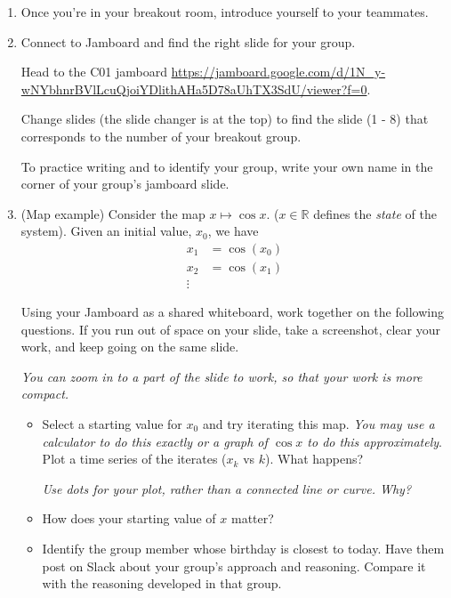 \documentclass[12pt,letterpaper,noanswers]{exam}
\begin{document}
\begin{enumerate}
\item  Once you're in your breakout room, introduce yourself to your teammates.  

\item Connect to Jamboard and find the right slide for your group.

Head to the C01 jamboard \url{https://jamboard.google.com/d/1N_y-wNYbhnrBVlLcuQjoiYDlithAHa5D78aUhTX3SdU/viewer?f=0}.  

Change slides (the slide changer is at the top) to find the slide (1 - 8) that corresponds to the number of your breakout group.

To practice writing and to identify your group, write your own name in the corner of your group's jamboard slide.


\item  (Map example) Consider the map $x\mapsto \cos x.$  ($x\in \mathbb{R}$ defines the {\it{state}} of the system).  Given an initial value, $x_0$, we have
\begin{align*}
x_1 &=\cos(x_0) \\
x_2 &= \cos(x_1) \\
\vdots
\end{align*}

Using your Jamboard as a shared whiteboard, work together on the following questions.  If you run out of space on your slide, take a screenshot, clear your work, and keep going on the same slide.

\emph{You can zoom in to a part of the slide to work, so that your work is more compact.}

\begin{itemize}
\item Select a starting value for $x_0$ and try iterating this map.  \emph{You may use a calculator to do this exactly or a graph of $\cos x$ to do this approximately}.  Plot a time series of the iterates ($x_k$ vs $k$).  What happens?

\emph{Use dots for your plot, rather than a connected line or curve.  Why?}
\item How does your starting value of $x$ matter?
\item  Identify the group member whose birthday is closest to today.  Have them post on Slack about your group's approach and reasoning.  Compare it with the reasoning developed in that group.
\end{itemize}


\end{enumerate}
\end{document}

